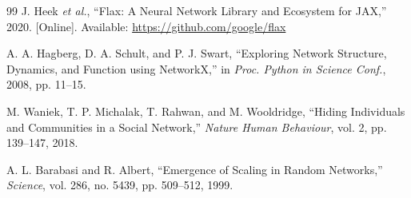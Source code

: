 \documentclass[12pt,oneside]{report}
\begin{document}
\begin{singlespace}
\begin{thebibliography}{99}
J. Heek \textit{et al.}, ``Flax: A Neural Network Library and Ecosystem for JAX,'' 2020. [Online]. Available: \url{https://github.com/google/flax}

A. A. Hagberg, D. A. Schult, and P. J. Swart, ``Exploring Network Structure, Dynamics, and Function using NetworkX,'' in \textit{Proc. Python in Science Conf.}, 2008, pp. 11--15.

M. Waniek, T. P. Michalak, T. Rahwan, and M. Wooldridge, ``Hiding Individuals and Communities in a Social Network,'' \textit{Nature Human Behaviour}, vol. 2, pp. 139--147, 2018.

A. L. Barabasi and R. Albert, ``Emergence of Scaling in Random Networks,'' \textit{Science}, vol. 286, no. 5439, pp. 509--512, 1999.
\end{thebibliography}
\end{singlespace}
\end{document}
